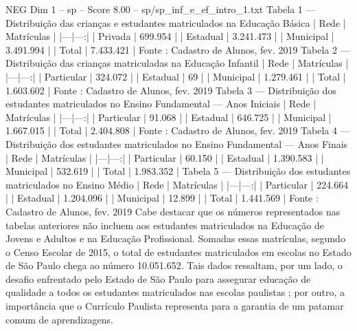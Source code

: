 \begin{textsample}{NEG Dim 1 – sp – Score 8.00 – sp/sp\_inf\_e\_ef\_intro\_1.txt}
Tabela 1 — Distribuição das crianças e estudantes matriculados na Educação Básica | Rede | Matrículas | |---|---:| | Privada | 699.954 | | Estadual | 3.241.473 | | Municipal | 3.491.994 | | Total | 7.433.421 | Fonte : Cadastro de Alunos, fev. 2019 Tabela 2 — Distribuição das crianças matriculadas na Educação Infantil | Rede | Matrículas | |---|---:| | Particular | 324.072 | | Estadual | 69 | | Municipal | 1.279.461 | | Total | 1.603.602 | Fonte : Cadastro de Alunos, fev. 2019 Tabela 3 — Distribuição dos estudantes matriculados no Ensino Fundamental — Anos Iniciais | Rede | Matrículas | |---|---:| | Particular | 91.068 | | Estadual | 646.725 | | Municipal | 1.667.015 | | Total | 2.404.808 | Fonte : Cadastro de Alunos, fev. 2019 Tabela 4 — Distribuição dos estudantes matriculados no Ensino Fundamental — Anos Finais | Rede | Matrículas | |---|---:| | Particular | 60.150 | | Estadual | 1.390.583 | | Municipal | 532.619 | | Total | 1.983.352 | Tabela 5 — Distribuição dos estudantes matriculados no Ensino Médio | Rede | Matrículas | |---|---:| | Particular | 224.664 | | Estadual | 1.204.096 | | Municipal | 12.899 | | Total | 1.441.569 | Fonte : Cadastro de Alunos, fev. 2019 Cabe destacar que os números representados nas tabelas anteriores não incluem aos estudantes matriculados na Educação de Jovens e Adultos e na Educação Profissional.
Somadas essas matrículas, segundo o Censo Escolar de 2015, o total de estudantes matriculados em escolas no Estado de São Paulo chega ao número 10.051.652.
Tais dados ressaltam, por um lado, o desafio enfrentado pelo Estado de São Paulo para assegurar educação de qualidade a todos os estudantes matriculados nas escolas paulistas ; por outro, a importância que o Currículo Paulista representa para a garantia de um patamar comum de aprendizagens.

\end{textsample}
